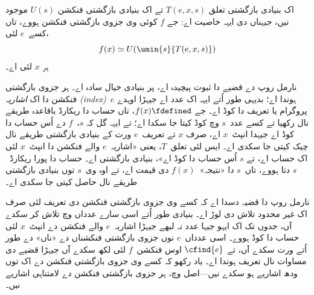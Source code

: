 \documentclass[../../../include/open-logic-section]{subfiles}
\begin{document}

\begin{thm}
اک بنیادی بازگشتی تعلق $T(e, x, s)$ تے اک بنیادی
بازگشتی فنکشن $U(s)$ موجود نیں، جیہناں دی ایہہ
خاصیت اے: جے $f$ کوئی وی جزوی بازگشتی فنکشن
ہووے، تاں کسے~$e$ لئی،
\[
f(x) \simeq U(\umin{s}{T(e, x, s)})
\]
ہر $x$ لئی اے۔
\end{thm}

\begin{explain}
نارمل روپ دے قضیے دا ثبوت پیچیدہ اے، پر بنیادی
خیال سادہ اے۔ ہر جزوی بازگشتی فنکشن دا اک
\emph{اشاریہ (index)}~$e$ ہوندا اے؛ بدیہی طور
اُتے ایہہ اک عدد اے جیہڑا اوہدے پروگرام یا تعریف
دا کوڈ اے۔ جے $f(x)
\fdefined$، تاں حساب دا ریکارڈ باقاعدہ طریقے نال
رکھیا تے کسے عدد~$s$ وچ کوڈ کیتا جا سکدا اے؛
تے ایہہ گل کہ $s$،~$f$ دے اُس حساب دا کوڈ
اے جیہدا انپٹ~$x$ اے، صرف $x$ تے تعریف~$e$ ورت
کے بنیادی بازگشتی طریقے نال چیک کیتی جا سکدی
اے۔ ایس لئی تعلق~$T$، یعنی «اشاریہ~$e$ والے
فنکشن دا انپٹ~$x$ لئی اک حساب اے، تے $s$
اُس حساب دا کوڈ اے»، بنیادی بازگشتی اے۔ حساب
دا پورا ریکارڈ~$s$ دتا ہووے، تاں~$s$ دا
«نتیجہ»~$f(x)$ دی قیمت اے، تے اوہ وی~$s$
توں بنیادی بازگشتی طریقے نال حاصل کیتی جا سکدی اے۔

نارمل روپ دا قضیہ دسدا اے کہ کسے وی جزوی
بازگشتی فنکشن دی تعریف لئی صرف اک غیر محدود
تلاش دی لوڑ اے۔ بنیادی طور اُتے اسی سارے عدداں
وچ تلاش کر سکدے آں، جدوں تک اک ایہو جیہا عدد
نہ لبھے جیہڑا اشاریہ~$e$ والے فنکشن دے
انپٹ~$x$ لئی حساب دا کوڈ ہووے۔ اسی عدداں~$e$
نوں جزوی بازگشتی فنکشناں دے «ناں» دے طور اُتے
ورت سکدے آں، تے $\cfind{e}$ اوس فنکشن~$f$
لئی لکھ سکدے آں جیہڑا قضیے دی مساوات نال
تعریف ہوندا اے۔ یاد رکھو کہ کسے وی جزوی بازگشتی
فنکشن دے اک توں ودھ اشاریے ہو سکدے نیں—اصل
وچ، ہر جزوی بازگشتی فنکشن دے لامتناہی اشاریے نیں۔
\end{explain}
\end{document}
